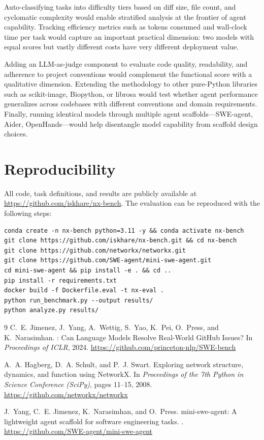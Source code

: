 \documentclass[10pt]{article}
\begin{document}
Auto-classifying tasks into difficulty tiers based on diff size, file count, and cyclomatic complexity would enable stratified analysis at the frontier of agent capability. Tracking efficiency metrics such as tokens consumed and wall-clock time per task would capture an important practical dimension: two models with equal scores but vastly different costs have very different deployment value.

Adding an LLM-as-judge component to evaluate code quality, readability, and adherence to project conventions would complement the functional score with a qualitative dimension. Extending the methodology to other pure-Python libraries such as scikit-image, Biopython, or librosa would test whether agent performance generalizes across codebases with different conventions and domain requirements. Finally, running identical models through multiple agent scaffolds---SWE-agent, Aider, OpenHands---would help disentangle model capability from scaffold design choices.

\section{Reproducibility}

All code, task definitions, and results are publicly available at \url{https://github.com/iskhare/nx-bench}. The evaluation can be reproduced with the following steps:

\begin{verbatim}
conda create -n nx-bench python=3.11 -y && conda activate nx-bench
git clone https://github.com/iskhare/nx-bench.git && cd nx-bench
git clone https://github.com/networkx/networkx.git
git clone https://github.com/SWE-agent/mini-swe-agent.git
cd mini-swe-agent && pip install -e . && cd ..
pip install -r requirements.txt
docker build -f Dockerfile.eval -t nx-eval .
python run_benchmark.py --output results/
python analyze.py results/
\end{verbatim}

\begin{thebibliography}{9}
C.~E. Jimenez, J.~Yang, A.~Wettig, S.~Yao, K.~Pei, O.~Press, and K.~Narasimhan.
: Can Language Models Resolve Real-World {GitHub} Issues?
\newblock In \emph{Proceedings of ICLR}, 2024.
\newblock \url{https://github.com/princeton-nlp/SWE-bench}

A.~A. Hagberg, D.~A. Schult, and P.~J. Swart.
\newblock Exploring network structure, dynamics, and function using {NetworkX}.
\newblock In \emph{Proceedings of the 7th Python in Science Conference (SciPy)}, pages 11--15, 2008.
\newblock \url{https://github.com/networkx/networkx}

J.~Yang, C.~E. Jimenez, K.~Narasimhan, and O.~Press.
\newblock mini-swe-agent: A lightweight agent scaffold for software engineering tasks.
.
\newblock \url{https://github.com/SWE-agent/mini-swe-agent}
\end{thebibliography}
\end{document}
